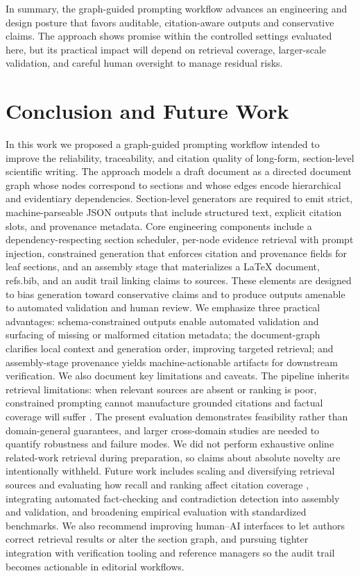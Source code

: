 \documentclass{article}%
\begin{document}
In summary, the graph-guided prompting workflow advances an engineering and design posture that favors auditable, citation-aware outputs and conservative claims. The approach shows promise within the controlled settings evaluated here, but its practical impact will depend on retrieval coverage, larger-scale validation, and careful human oversight to manage residual risks.%

%
\section{Conclusion and Future Work}%


%
In this work we proposed a graph-guided prompting workflow intended to improve the reliability, traceability, and citation quality of long-form, section-level scientific writing.
The approach models a draft document as a directed document graph whose nodes correspond to sections and whose edges encode hierarchical and evidentiary dependencies.
Section-level generators are required to emit strict, machine-parseable JSON outputs that include structured text, explicit citation slots, and provenance metadata.
Core engineering components include a dependency-respecting section scheduler, per-node evidence retrieval with prompt injection, constrained generation that enforces citation and provenance fields for leaf sections, and an assembly stage that materializes a LaTeX document, refs.bib, and an audit trail linking claims to sources.
These elements are designed to bias generation toward conservative claims and to produce outputs amenable to automated validation and human review.
We emphasize three practical advantages: schema-constrained outputs enable automated validation and surfacing of missing or malformed citation metadata; the document-graph clarifies local context and generation order, improving targeted retrieval; and assembly-stage provenance yields machine-actionable artifacts for downstream verification.
We also document key limitations and caveats.
The pipeline inherits retrieval limitations: when relevant sources are absent or ranking is poor, constrained prompting cannot manufacture grounded citations and factual coverage will suffer \cite{web_deng_2025_the_next_phase_of_scientific_fact_checking_advan}.
The present evaluation demonstrates feasibility rather than domain-general guarantees, and larger cross-domain studies are needed to quantify robustness and failure modes.
We did not perform exhaustive online related-work retrieval during preparation, so claims about absolute novelty are intentionally withheld.
Future work includes scaling and diversifying retrieval sources and evaluating how recall and ranking affect citation coverage \cite{web_deng_2025_the_next_phase_of_scientific_fact_checking_advan}, integrating automated fact-checking and contradiction detection into assembly and validation, and broadening empirical evaluation with standardized benchmarks.
We also recommend improving human--AI interfaces to let authors correct retrieval results or alter the section graph, and pursuing tighter integration with verification tooling and reference managers so the audit trail becomes actionable in editorial workflows.%

%
%
%
\end{document}
